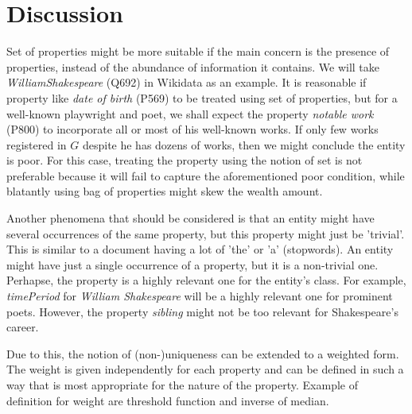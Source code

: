 \section{Discussion}



Set of properties might be more suitable if the main concern is the presence of properties, instead of the abundance of information it contains. We will take \textit{WilliamShakespeare} (Q692) in Wikidata as an example. It is reasonable if property like  \textit{date of birth} (P569) to be treated using set of properties, but for a well-known playwright and poet, we shall expect the property \textit{notable work} (P800) to incorporate all or most of his well-known works. If only few works registered in \(G\) despite he has dozens of works, then we might conclude the entity is poor. For this case, treating the property using the notion of set is not preferable because it will fail to capture the aforementioned poor condition, while blatantly using bag of properties might skew the wealth amount.

Another phenomena that should be considered is that an entity might have several occurrences of the same property, but this property might just be 'trivial'. This is similar to a document having a lot of 'the' or 'a' (stopwords). An entity might have just a single occurrence of a property, but it is a non-trivial one. Perhapse, the property is a highly relevant one for the entity's class. For example, \textit{timePeriod} for \textit{William Shakespeare} will be a highly relevant one for prominent poets. However, the property \textit{sibling} might not be too relevant for Shakespeare's career.

Due to this, the notion of (non-)uniqueness can be extended to a weighted form. The weight is given independently for each property and can be defined in such a way that is most appropriate for the nature of the property. Example of definition for weight are threshold function and inverse of median.

